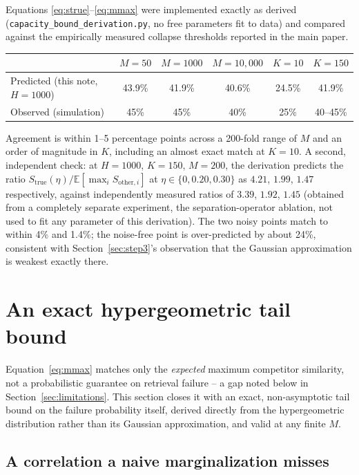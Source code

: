 \documentclass[11pt]{article}
\newcommand{\toprule}{\hline\hline}
\newcommand{\midrule}{\hline}
\newcommand{\bottomrule}{\hline\hline}
\begin{document}
Equations \ref{eq:strue}--\ref{eq:mmax} were implemented exactly as derived
(\texttt{capacity\_bound\_derivation.py}, no free parameters fit to data) and compared against
the empirically measured collapse thresholds reported in the main paper.

\begin{center}
\begin{tabular}{lccccc}
\toprule
 & $M{=}50$ & $M{=}1000$ & $M{=}10{,}000$ & $K{=}10$ & $K{=}150$ \\
\midrule
Predicted (this note, $H{=}1000$) & 43.9\% & 41.9\% & 40.6\% & 24.5\% & 41.9\% \\
Observed (simulation) & 45\% & 45\% & 40\% & 25\% & 40--45\% \\
\bottomrule
\end{tabular}
\end{center}

Agreement is within 1--5 percentage points across a 200-fold range of $M$ and an order of
magnitude in $K$, including an almost exact match at $K=10$. A second, independent check: at
$H{=}1000$, $K{=}150$, $M{=}200$, the derivation predicts the ratio $S_{\text{true}}(\eta) /
\mathbb{E}[\max_{i} S_{\text{other},i}]$ at $\eta \in \{0, 0.20, 0.30\}$ as $4.21$, $1.99$,
$1.47$ respectively, against independently measured ratios of $3.39$, $1.92$, $1.45$ (obtained
from a completely separate experiment, the separation-operator ablation, not used to fit any
parameter of this derivation). The two noisy points match to within 4\% and 1.4\%; the
noise-free point is over-predicted by about 24\%, consistent with Section~\ref{sec:step3}'s
observation that the Gaussian approximation is weakest exactly there.

\section{An exact hypergeometric tail bound}
\label{sec:exacttail}

Equation~\ref{eq:mmax} matches only the \emph{expected} maximum competitor similarity, not a
probabilistic guarantee on retrieval failure -- a gap noted below in
Section~\ref{sec:limitations}. This section closes it with an exact, non-asymptotic tail bound
on the failure probability itself, derived directly from the hypergeometric distribution rather
than its Gaussian approximation, and valid at any finite $M$.

\subsection{A correlation a naive marginalization misses}
\label{sec:exacttail-pitfall}
\end{document}
